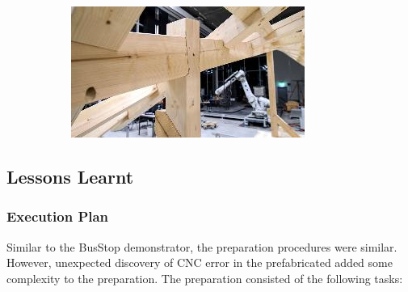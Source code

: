 \documentclass[11pt]{book}
\begin{document}
{\begin{figure}[H]
\begin{subfigure}[b]{0.23\textwidth}
\end{subfigure}
\hfill
\begin{subfigure}[b]{0.23\textwidth}
\centering
\includegraphics[width=\textwidth]{./images/image28.jpeg}
\end{subfigure}
\end{figure}
}

\subsection{Lessons Learnt}

\subsubsection{Execution Plan}

Similar to the BusStop demonstrator, the preparation procedures were similar. However, unexpected discovery of CNC error in the prefabricated added some complexity to the preparation. The preparation consisted of the following tasks:
\end{document}
